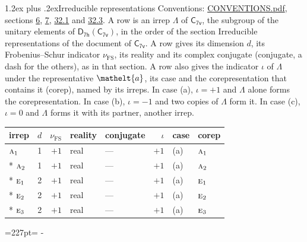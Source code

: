 \documentclass[10pt,a4paper]{article}
\makeatletter
\renewcommand\section{\@startsection{section}{1}{\z@}{-3ex plus -1ex minus -.2ex}%
  {1.2ex plus .2ex}{\normalfont\large\sffamily\bfseries\color{parttitle}}}
\newcommand{\needspace}[1]{\par\penalty-100\begingroup\dimen0=#1\relax\dimen2=\pagegoal
  \advance\dimen2-\pagetotal\ifdim\dimen0>\dimen2\relax\ifdim\dimen2>0pt\vfil\break\fi\fi
  \endgroup}
\numberwithin{equation}{section}
\newcommand{\eltfont}[1]{{\let\sigma\eltsigma\mathelt{#1}}}
\newcommand{\grp}[1]{\mathsf{#1}}
\newcommand{\irr}[1]{\text{\normalfont\scshape #1}}
\newcommand{\elt}[1]{\eltfont{#1}}
\newcommand{\fsind}{\nu_{\mathrm{FS}}}
\makeatother
\begin{document}
\section{Irreducible representations}\label{s:irreps}
Conventions: \href{../../CONVENTIONS.pdf}{CONVENTIONS.pdf}, sections \href{../../../rotation/CONVENTIONS.pdf\#conv.6}{6}, \href{../../../rotation/CONVENTIONS.pdf\#conv.7}{7}, \href{../../CONVENTIONS.pdf\#conv.32.1}{32.1} and \href{../../CONVENTIONS.pdf\#conv.32.3}{32.3}.
\leavevmode\label{n:irrep.Delta}A row is an irrep $\Lambda$ of $\grp{C_{7v}}$, the subgroup of the unitary elements of $\grp{D_{7h}}(\grp{C_{7v}})$, in the order of the section Irreducible representations of the document of \href{../../../rotation/data/pdf/C7v.pdf}{$\grp{C_{7v}}$}. \label{n:index.dimension}\label{n:index.frobenius}\label{n:head.irrep}\label{n:head.reality}\label{n:head.conjugate}A row gives its dimension $d$, its Frobenius--Schur indicator $\fsind$, its reality and its complex conjugate (conjugate, a dash for the others), as in that section. \label{n:head.case.corep}\label{n:head.corep}A row also gives the indicator $\iota$ of $\Lambda$ under the representative $\elt{a}$, its case and the corepresentation that contains it (corep), named by its irreps. In case (a), $\iota = +1$ and $\Lambda$ alone forms the corepresentation. In case (b), $\iota = -1$ and two copies of $\Lambda$ form it. In case (c), $\iota = 0$ and $\Lambda$ forms it with its partner, another irrep.
\setlength{\emergencystretch}{2em}\par\setlength{\emergencystretch}{0pt}
{\small\renewcommand{\arraystretch}{1.25}\setlength{\tabcolsep}{4pt}\begin{longtable}{@{}lrrllrll@{}}\toprule
irrep & $d$ & $\fsind$ & reality & conjugate & $\iota$ & case & corep\\\midrule\endhead
\bottomrule\endfoot\endlastfoot
$\irr{a}_{1}$ & 1 & $+1$ & real & --- & $+1$ & (a) & $\irr{a}_{1}$\\*
$\irr{a}_{2}$ & 1 & $+1$ & real & --- & $+1$ & (a) & $\irr{a}_{2}$\\*
$\irr{e}_{1}$ & 2 & $+1$ & real & --- & $+1$ & (a) & $\irr{e}_{1}$\\*
$\irr{e}_{2}$ & 2 & $+1$ & real & --- & $+1$ & (a) & $\irr{e}_{2}$\\*
$\irr{e}_{3}$ & 2 & $+1$ & real & --- & $+1$ & (a) & $\irr{e}_{3}$\\
\bottomrule\end{longtable}}
\needspace{227pt}
\end{document}

